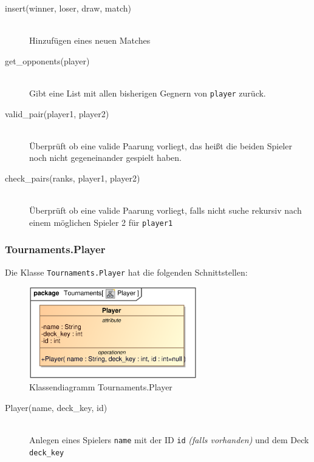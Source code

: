 \begin{description}
    \item[insert(winner, loser, draw, match)] \hfill \\
    Hinzufügen eines neuen Matches
    
    \item[get\_opponents(player)] \hfill \\
    Gibt eine List mit allen bisherigen Gegnern von \verb|player| zurück.
    
    \item[valid\_pair(player1, player2)] \hfill \\
    Überprüft ob eine valide Paarung vorliegt, das heißt die beiden Spieler noch nicht gegeneinander gespielt haben.
    
    \item[check\_pairs(ranks, player1, player2)] \hfill \\
    Überprüft ob eine valide Paarung vorliegt, falls nicht suche rekursiv nach einem möglichen Spieler 2 für \verb|player1|
\end{description}

\subsubsection{Tournaments.Player}
Die Klasse \verb|Tournaments.Player| hat die folgenden Schnittstellen:

\begin{figure}[H]
    \myfloatalign
    \includegraphics[width=0.65\textwidth]{gfx/MtGDeepAnalysis/Player.eps}
    \caption{Klassendiagramm Tournaments.Player}
    \label{fig:class:Tournaments.Player}
\end{figure}

\begin{description}
    \item[Player(name, deck\_key, id)] \hfill \\
    Anlegen eines Spielers \verb|name| mit der ID \verb|id| \emph{(falls vorhanden)} und dem Deck \verb|deck_key|
\end{description}

